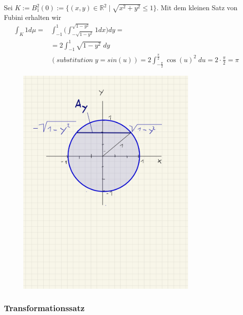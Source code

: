 \begin{Beispiel} 
Sei $K := B^2_1(0) := \{   (x,y) \in \mathbb{R}^2 \; | \; \sqrt{x^2 + y^2 } \leq 1\}$. Mit dem kleinen Satz von Fubini erhalten wir
\begin{align*}
\int_K 1 d \mu = &  \int_{-1}^{1} \biggl ( \int_{-\sqrt{1- y^2}}^{\sqrt{1- y^2}} 1 dx \biggr ) dy = \\ 
& =  2 \int_{-1}^{1}  \sqrt{1 - y^2}   \; dy  \\ 
 & (substitution \;   y = sin(u)) =   2 \int_{-\frac{\pi}{2}}^{\frac{\pi}{2}}   \cos(u)^2   \; du = 2 \cdot \frac{\pi}{2} = \pi
\end{align*}
\end{Beispiel}
\begin{figure}[H]
      \centering
    \includegraphics[width=0.8\textwidth]{images/Kreis}
\end{figure}


\subsubsection*{Transformationssatz}




